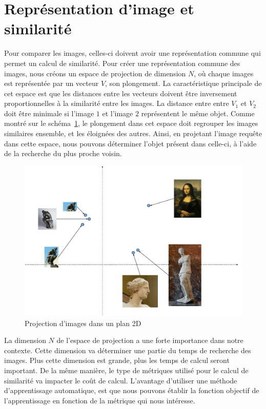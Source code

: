  
\section{Représentation d'image et similarité}

Pour comparer les images, celles-ci doivent avoir une représentation commune qui permet un calcul de similarité.
Pour créer une représentation commune des images, nous créons un espace de projection de dimension $N$, où chaque images est représentée par un vecteur $V$, son plongement.
La caractéristique principale de cet espace est que les distances entre les vecteurs doivent être inversement proportionnelles à la similarité entre les images. 
La distance entre entre $V_1$ et $V_2$ doit être minimale si l'image $1$ et l'image $2$ représentent le même objet.
Comme montré sur le schéma~\ref{fig:imagespace}, le plongement dans cet espace doit regrouper les images similaires ensemble, et les éloignées des autres. 
Ainsi, en projetant l'image requête dans cette espace, nous pouvons déterminer l'objet présent dans celle-ci, à l’aide de la recherche du plus proche voisin.

\begin{figure}
\includegraphics[width=\columnwidth]{figures/imagespace.pdf}
\caption{Projection d’images dans un plan 2D}
\label{fig:imagespace}
\end{figure}


La dimension $N$ de l'espace de projection a une forte importance dans notre contexte. Cette dimension va déterminer une partie du temps de recherche des images. Plus cette dimension est grande, plus les temps de calcul seront important. De la même manière, le type de métriques utilisé pour le calcul de similarité va impacter le coût de calcul. 
L'avantage d'utiliser une méthode d'apprentissage automatique, est que nous pouvons établir la fonction objectif de l'apprentissage en fonction de la métrique qui nous intéresse. 


